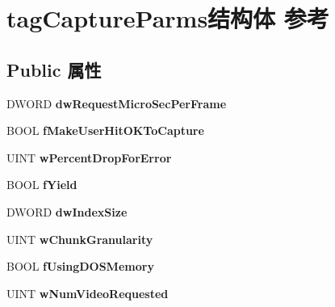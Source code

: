 \hypertarget{structtag_capture_parms}{}\section{tag\+Capture\+Parms结构体 参考}
\label{structtag_capture_parms}
\subsection*{Public 属性}
\begin{DoxyCompactItemize}
\item 
\mbox{\label{structtag_capture_parms_a853c5248b5b64edf81f615126a3e7e1c}} 
D\+W\+O\+RD {\bfseries dw\+Request\+Micro\+Sec\+Per\+Frame}
\item 
\mbox{\label{structtag_capture_parms_a24bd3436065c659a9b25998b3086fc19}} 
B\+O\+OL {\bfseries f\+Make\+User\+Hit\+O\+K\+To\+Capture}
\item 
\mbox{\label{structtag_capture_parms_a59127b795cd95cd68aa0a71741b131c0}} 
U\+I\+NT {\bfseries w\+Percent\+Drop\+For\+Error}
\item 
\mbox{\label{structtag_capture_parms_ab767d58405fae16e1c0b138fbc481ca8}} 
B\+O\+OL {\bfseries f\+Yield}
\item 
\mbox{\label{structtag_capture_parms_a1955596e767dde95fd9973fee801872c}} 
D\+W\+O\+RD {\bfseries dw\+Index\+Size}
\item 
\mbox{\label{structtag_capture_parms_afc129376148f049acf90e1f7a89e3d83}} 
U\+I\+NT {\bfseries w\+Chunk\+Granularity}
\item 
\mbox{\label{structtag_capture_parms_a76c9a4c6120a91584284509822a3bc61}} 
B\+O\+OL {\bfseries f\+Using\+D\+O\+S\+Memory}
\item 
\mbox{\label{structtag_capture_parms_a3b74ea69ecca3183026fb364a855d822}} 
U\+I\+NT {\bfseries w\+Num\+Video\+Requested}
\item 
\mbox{\label{structtag_capture_parms_abdab8fc090c51b3db464666e5d01e908}} 

\end{DoxyCompactItemize}
